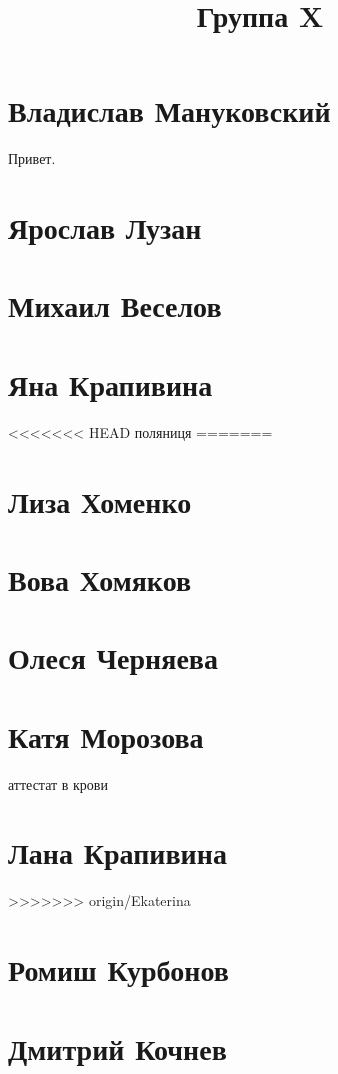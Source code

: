 \documentclass{article}
\title{Группа X}
\begin{document}
\section*{Владислав Мануковский}
Привет.
\section*{Ярослав Лузан}

\section*{Михаил Веселов}

\section*{Яна Крапивина}
<<<<<<< HEAD
поляниця
=======

\section*{Лиза Хоменко}

\section*{Вова Хомяков}

\section*{Олеся Черняева}

\section*{Катя Морозова}
аттестат в крови

\section*{Лана Крапивина}

>>>>>>> origin/Ekaterina
\section*{Ромиш Курбонов}

\section*{Дмитрий Кочнев}
\end{document}
